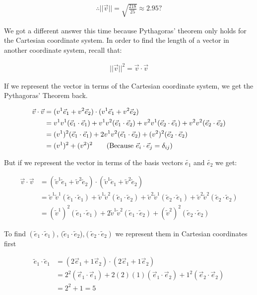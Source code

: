 \documentclass{book}
\begin{document}
\begin{align*}
\therefore ||\vec{v}|| = \sqrt{\frac{218}{25}} \approx 2.95?
\end{align*}

We got a different answer this time because Pythagoras' theorem only holds for the Cartesian coordinate system. In order to find the length of a vector in another coordinate system, recall that:

 \begin{align*}
   ||\vec{v}||^2
   = \vec{v}\cdot\vec{v}
 \end{align*}

 If we represent the vector in terms of the Cartesian coordinate system, we get the Pythagoras' Theorem back.

\begin{align*}
  \vec{v}\cdot\vec{v}
  &= (v^1\vec{e}_1+v^2\vec{e}_2) \cdot (v^1\vec{e}_1+v^2\vec{e}_2) \\
  &= v^1v^1(\vec{e}_1\cdot \vec{e}_1)+v^1v^2(\vec{e}_1\cdot \vec{e}_2)+v^2v^1(\vec{e}_2\cdot \vec{e}_1)+v^2v^2(\vec{e}_2\cdot \vec{e}_2) \\
  &= (v^1)^2(\vec{e}_1\cdot \vec{e}_1)+2v^1v^2(\vec{e}_1\cdot \vec{e}_2)+(v^2)^2(\vec{e}_2\cdot \vec{e}_2) \\
  &= (v^1)^2+(v^2)^2 \tag{Because \(\vec{e}_i\cdot\vec{e}_j = \delta_{ij}\)}
 \end{align*}

But if we represent the vector in terms of the basis vectors \(\tilde{e_1}\) and \(\tilde{e_2}\) we get:

\begin{align}
  \vec{v}\cdot\vec{v}
  &= (\tilde{v}^1\tilde{e}_1+\tilde{v}^2\tilde{e}_2) \cdot (\tilde{v}^1\tilde{e}_1+\tilde{v}^2\tilde{e}_2) \nonumber\\
  &= \tilde{v}^1\tilde{v}^1(\tilde{e}_1\cdot \tilde{e}_1)+\tilde{v}^1\tilde{v}^2(\tilde{e}_1\cdot \tilde{e}_2)+\tilde{v}^2\tilde{v}^1(\tilde{e}_2\cdot \tilde{e}_1)+\tilde{v}^2\tilde{v}^2(\tilde{e}_2\cdot \tilde{e}_2) \nonumber \\
  &= (\tilde{v}^1)^2(\tilde{e}_1\cdot \tilde{e}_1)+2\tilde{v}^1\tilde{v}^2(\tilde{e}_1\cdot \tilde{e}_2)+(\tilde{v}^2)^2(\tilde{e}_2\cdot \tilde{e}_2)
\end{align}

To find \((\tilde{e}_1\cdot \tilde{e}_1)\), \((\tilde{e}_1\cdot \tilde{e}_2\)),\((\tilde{e}_2\cdot \tilde{e}_2)\) we represent them in Cartesian coordinates first

\begin{align*}
  \tilde{e}_1\cdot\tilde{e}_1
  &=(2\vec{e}_1+1\vec{e}_2)\cdot(2\vec{e}_1+1\vec{e}_2)\\
  &=2^2(\vec{e}_1\cdot\vec{e}_1)+2(2)(1)(\vec{e}_1\cdot\vec{e}_2)+1^2(\vec{e}_2\cdot\vec{e}_2)\\
  &=2^2+1=5
\end{align*}
\end{document}
